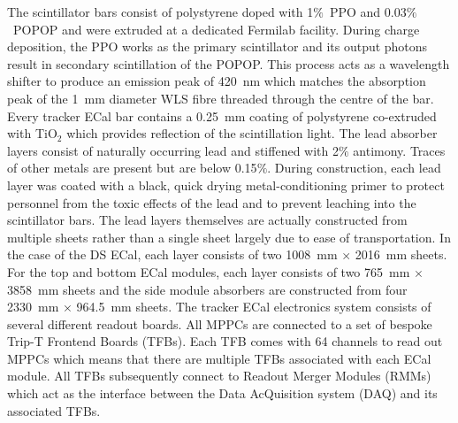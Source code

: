 \newline
\newline
The scintillator bars consist of polystyrene doped with 1$\%$~PPO and 0.03$\%$~POPOP and were extruded at a dedicated Fermilab facility.  During charge deposition, the PPO works as the primary scintillator and its output photons result in secondary scintillation of the POPOP.  This process acts as a wavelength shifter to produce an emission peak of 420~nm which matches the absorption peak of the 1~mm diameter WLS fibre threaded through the centre of the bar.  Every tracker ECal bar contains a 0.25~mm coating of polystyrene co-extruded with TiO$_2$ which provides reflection of the scintillation light.
\newline
\newline
The lead absorber layers consist of naturally occurring lead and stiffened with 2$\%$ antimony.  Traces of other metals are present but are below 0.15$\%$.  During construction, each lead layer was coated with a black, quick drying metal-conditioning primer to protect personnel from the toxic effects of the lead and to prevent leaching into the scintillator bars.  The lead layers themselves are actually constructed from multiple sheets rather than a single sheet largely due to ease of transportation.  In the case of the DS ECal, each layer consists of two 1008~mm $\times$ 2016~mm sheets.  For the top and bottom ECal modules, each layer consists of two 765~mm $\times$ 3858~mm sheets and the side module absorbers are constructed from four 2330~mm $\times$ 964.5~mm sheets.
\newline
\newline
The tracker ECal electronics system consists of several different readout boards.  All MPPCs are connected to a set of bespoke Trip-T Frontend Boards (TFBs).  Each TFB comes with 64 channels to read out MPPCs which means that there are multiple TFBs associated with each ECal module.  All TFBs subsequently connect to Readout Merger Modules (RMMs) which act as the interface between the Data AcQuisition system (DAQ) and its associated TFBs.

